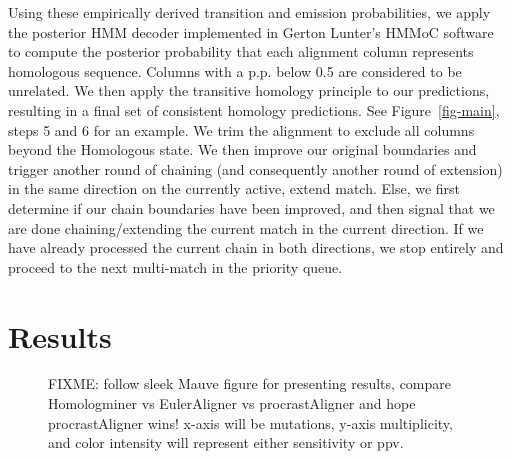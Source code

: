 \documentclass{ws-procs975x65}
\begin{document}
Using these empirically derived transition and emission probabilities, we apply the posterior HMM decoder implemented in Gerton Lunter's HMMoC software~\cite{hmmoc} to compute the posterior probability that each alignment column represents homologous sequence.  Columns with a p.p. below 0.5 are considered to be unrelated.  We then apply the transitive homology principle to our predictions, resulting in a final set of consistent homology predictions.  See Figure~\ref{fig-main}, steps 5 and 6 for an example. We trim the alignment to exclude all columns beyond the Homologous state. We then improve our original boundaries and trigger another round of chaining (and consequently another round of extension) in the same direction on the currently active, extend match. Else, we first determine if our chain boundaries have been improved, and then signal that we are done chaining/extending the current match in the current direction. If we have already processed the current chain in both directions, we stop entirely and proceed to the next multi-match in the priority queue.


\section{Results}
\begin{figure}[t]
\centering {}
\caption{FIXME: follow sleek Mauve figure for presenting results, compare Homologminer vs EulerAligner vs procrastAligner and hope procrastAligner wins! x-axis will be mutations, y-axis multiplicity, and color intensity will represent either sensitivity or ppv.}
\label{fig-results}\vspace{-0.2cm}
\end{figure}


%
%
\end{document}
